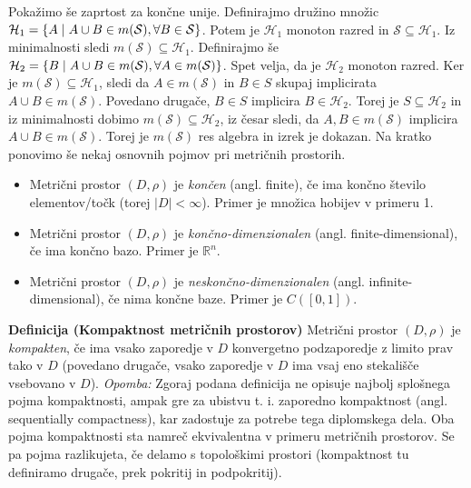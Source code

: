 \documentclass[mat1]{article}
\theoremstyle{definition}
\begin{document}
\newline
Pokažimo še zaprtost za končne unije. Definirajmo družino množic $\mathcal{H}_1 = \{ A\hspace{0.1cm}|\hspace{0.1cm} A \cup B \in m(\mathcal{S}), \forall B \in \mathcal{S}\}$. Potem je $\mathcal{H}_1$ monoton razred in $\mathcal{S} \subseteq \mathcal{H}_1$. Iz minimalnosti sledi $m(\mathcal{S}) \subseteq \mathcal{H}_1$. Definirajmo še  $\mathcal{H}_2 = \{ B\hspace{0.1cm}|\hspace{0.1cm} A \cup B \in m(\mathcal{S}), \forall A \in m(\mathcal{S})\}$. Spet velja, da je $\mathcal{H}_2$ monoton razred. Ker je $m(\mathcal{S}) \subseteq \mathcal{H}_1$, sledi da $A \in m(\mathcal{S})$ in $B \in S$ skupaj implicirata $A \cup B \in m(\mathcal{S})$. Povedano drugače, $B \in S$ implicira $B \in \mathcal{H}_2$. Torej je $S \subseteq \mathcal{H}_2$  in iz minimalnosti dobimo $m(\mathcal{S}) \subseteq \mathcal{H}_2$, iz česar sledi, da $A,B \in m(\mathcal{S})$ implicira $A \cup B \in m(\mathcal{S})$. Torej je $m(\mathcal{S})$ res algebra in izrek je dokazan.
\newline
\newline
\newline
Na kratko ponovimo še nekaj osnovnih pojmov pri metričnih prostorih.
\begin{itemize}
\item Metrični prostor $(D, \rho)$ je \textit{končen} (angl. finite), če ima končno število elementov/točk (torej $|D| < \infty$). Primer je množica hobijev v primeru 1.
\item Metrični prostor $(D, \rho)$ je \textit{končno-dimenzionalen} (angl. finite-dimensional), če ima končno bazo. Primer je $\mathbb{R}^n$.
\item Metrični prostor $(D, \rho)$ je \textit{neskončno-dimenzionalen} (angl. infinite-dimensional), če nima končne baze. Primer je $C([0,1])$.
\end{itemize}
\textbf{Definicija (Kompaktnost metričnih prostorov)} Metrični prostor $(D, \rho)$ je \textit{kompakten}, če ima vsako zaporedje v $D$ konvergetno podzaporedje z limito prav tako v $D$ (povedano drugače, vsako zaporedje v $D$ ima vsaj eno stekališče vsebovano v $D$).
\newline
\newline
\textit{Opomba:}
Zgoraj podana definicija ne opisuje najbolj splošnega pojma kompaktnosti, ampak gre za ubistvu t. i. zaporedno kompaktnost (angl. sequentially compactness), kar zadostuje za potrebe tega diplomskega dela. Oba pojma kompaktnosti sta namreč ekvivalentna v primeru metričnih prostorov. Se pa pojma razlikujeta, če delamo s topološkimi prostori (kompaktnost tu definiramo drugače, prek pokritij in podpokritij).
\end{document}
